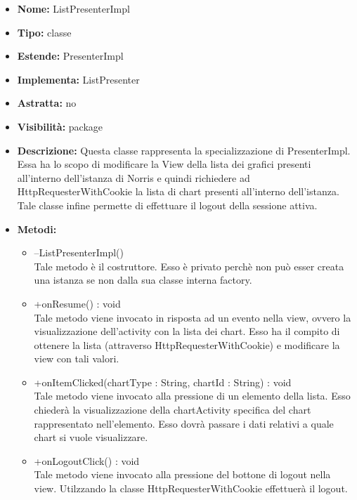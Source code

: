 			
			\begin{itemize}
			\item \textbf{Nome:} ListPresenterImpl
			\item \textbf{Tipo:} classe
			
		\item \textbf{Estende:}
		PresenterImpl
		\item \textbf{Implementa:}
		ListPresenter
		\item \textbf{Astratta:}
		no
			\item \textbf{Visibilità:} package
			\item \textbf{Descrizione:} Questa classe rappresenta la specializzazione di PresenterImpl. Essa ha lo scopo di modificare la View della lista dei grafici presenti all'interno dell'istanza di Norris e quindi richiedere ad HttpRequesterWithCookie la lista di chart presenti all'interno dell'istanza. Tale classe infine permette di effettuare il logout della sessione attiva.
			\item \textbf{Metodi:}
				\begin{itemize}
				\setlength{\itemsep}{5pt}
				
					\item[\ding{111}] {{--ListPresenterImpl()}} \\ [1mm] Tale metodo è il costruttore. Esso è privato perchè non può esser creata una istanza se non dalla sua classe interna factory.
					\item[\ding{111}] {{+onResume() : void}} \\ [1mm] Tale metodo viene invocato in risposta ad un evento nella view, ovvero la visualizzazione dell'activity con la lista dei chart. Esso ha il compito di ottenere la lista (attraverso HttpRequesterWithCookie) e modificare la view con tali valori.
					\item[\ding{111}] {{+onItemClicked(chartType : String, chartId : String) : void}} \\ [1mm] Tale metodo viene invocato alla pressione di un elemento della lista. Esso chiederà la visualizzazione della chartActivity specifica del chart rappresentato nell'elemento. Esso dovrà passare i dati relativi a quale chart si vuole visualizzare.
					\item[\ding{111}] {{+onLogoutClick() : void}} \\ [1mm] Tale metodo viene invocato alla pressione del bottone di logout nella view. Utilzzando la classe HttpRequesterWithCookie effettuerà il logout.
				\end{itemize}
		
			\end{itemize}

